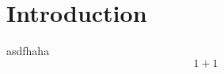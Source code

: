 \documentclass[twocolumn]{article}
\begin{document}
\section{Introduction}


asdfhaha
\begin{equation}
    \label{eq1}
    1+1 
\end{equation}
\end{document}
